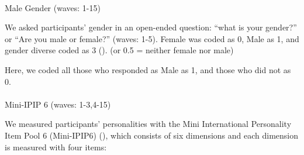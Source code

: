 \documentclass[
  single column]{article}
\makeatletter
\let\oldparagraph\paragraph
\renewcommand{\paragraph}{
    \@ifstar
      \xxxParagraphStar
      \xxxParagraphNoStar
  }
\newcommand{\xxxParagraphStar}[1]{\oldparagraph*{#1}\mbox{}}
\newcommand{\xxxParagraphNoStar}[1]{\oldparagraph{#1}\mbox{}}
\makeatother
\begin{document}
\paragraph{Male Gender (waves: 1-15)}\label{male-gender-waves-1-15}

We asked participants' gender in an open-ended question: ``what is your
gender?'' or ``Are you male or female?'' (waves: 1-5). Female was coded
as 0, Male as 1, and gender diverse coded as 3
(). (or 0.5
= neither female nor male)

Here, we coded all those who responded as Male as 1, and those who did
not as 0.

\paragraph{Mini-IPIP 6 (waves:
1-3,4-15)}\label{mini-ipip-6-waves-1-34-15}

We measured participants' personalities with the Mini International
Personality Item Pool 6 (Mini-IPIP6) (), which consists of six dimensions and each
dimension is measured with four items:
\end{document}
